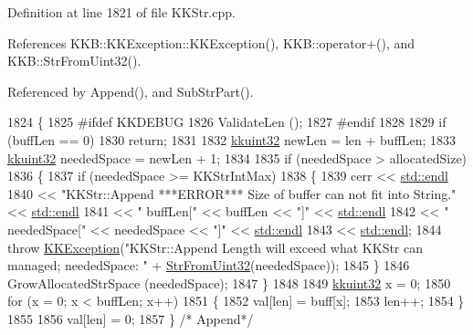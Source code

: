 Definition at line 1821 of file K\+K\+Str.\+cpp.



References K\+K\+B\+::\+K\+K\+Exception\+::\+K\+K\+Exception(), K\+K\+B\+::operator+(), and K\+K\+B\+::\+Str\+From\+Uint32().



Referenced by Append(), and Sub\+Str\+Part().


\begin{DoxyCode}
1824 \{
1825 \textcolor{preprocessor}{  #ifdef  KKDEBUG}
1826   ValidateLen ();
1827 \textcolor{preprocessor}{  #endif}
1828 
1829   \textcolor{keywordflow}{if}  (buffLen == 0)  
1830     \textcolor{keywordflow}{return};
1831 
1832   \hyperlink{namespace_k_k_b_af8d832f05c54994a1cce25bd5743e19a}{kkuint32}  newLen = len + buffLen;
1833   \hyperlink{namespace_k_k_b_af8d832f05c54994a1cce25bd5743e19a}{kkuint32}  neededSpace = newLen + 1;
1834 
1835   \textcolor{keywordflow}{if}  (neededSpace > allocatedSize)
1836   \{
1837     \textcolor{keywordflow}{if}  (neededSpace >= KKStrIntMax)
1838     \{
1839       cerr << \hyperlink{namespace_k_k_b_ad1f50f65af6adc8fa9e6f62d007818a8}{std::endl} 
1840            << \textcolor{stringliteral}{"KKStr::Append   ***ERROR***   Size of buffer can not fit into String."} << 
      \hyperlink{namespace_k_k_b_ad1f50f65af6adc8fa9e6f62d007818a8}{std::endl}
1841            << \textcolor{stringliteral}{"                buffLen["} << buffLen         << \textcolor{stringliteral}{"]"} << \hyperlink{namespace_k_k_b_ad1f50f65af6adc8fa9e6f62d007818a8}{std::endl}
1842            << \textcolor{stringliteral}{"                neededSpace["} << neededSpace << \textcolor{stringliteral}{"]"} << \hyperlink{namespace_k_k_b_ad1f50f65af6adc8fa9e6f62d007818a8}{std::endl}
1843            << \hyperlink{namespace_k_k_b_ad1f50f65af6adc8fa9e6f62d007818a8}{std::endl};
1844       \textcolor{keywordflow}{throw} \hyperlink{class_k_k_b_1_1_k_k_exception}{KKException}(\textcolor{stringliteral}{"KKStr::Append  Length will exceed what KKStr can managed;  neededSpace:
       "} + \hyperlink{namespace_k_k_b_a3cfc4769d4e2de370b13062faefc8235}{StrFromUint32}(neededSpace));
1845     \}
1846     GrowAllocatedStrSpace (neededSpace);
1847   \}
1848 
1849   \hyperlink{namespace_k_k_b_af8d832f05c54994a1cce25bd5743e19a}{kkuint32}  x = 0;
1850   \textcolor{keywordflow}{for}  (x = 0;  x < buffLen;  x++)
1851   \{
1852     val[len] = buff[x];
1853     len++;
1854   \}
1855 
1856   val[len] = 0;
1857 \}  \textcolor{comment}{/* Append*/}
\end{DoxyCode}
